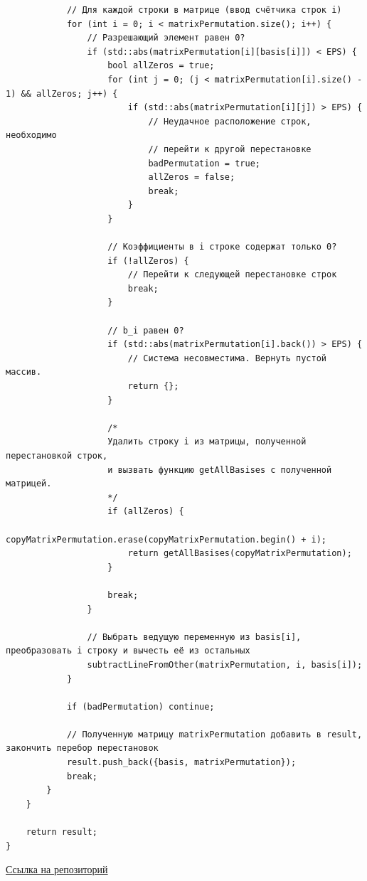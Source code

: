 \documentclass[a4paper,14pt]{extarticle}
\begin{document}
\begin{verbatim}
            // Для каждой строки в матрице (ввод счётчика строк i)
            for (int i = 0; i < matrixPermutation.size(); i++) {
                // Разрешающий элемент равен 0? 
                if (std::abs(matrixPermutation[i][basis[i]]) < EPS) {
                    bool allZeros = true;
                    for (int j = 0; (j < matrixPermutation[i].size() - 1) && allZeros; j++) {
                        if (std::abs(matrixPermutation[i][j]) > EPS) {
                            // Неудачное расположение строк, необходимо
                            // перейти к другой перестановке
                            badPermutation = true;
                            allZeros = false;
                            break;
                        }
                    }

                    // Коэффициенты в i строке содержат только 0?
                    if (!allZeros) {
                        // Перейти к следующей перестановке строк
                        break;
                    }

                    // b_i равен 0?
                    if (std::abs(matrixPermutation[i].back()) > EPS) {
                        // Система несовместима. Вернуть пустой массив.
                        return {};
                    }

                    /*
                    Удалить строку i из матрицы, полученной перестановкой строк,
                    и вызвать функцию getAllBasises с полученной матрицей.
                    */
                    if (allZeros) {
                        copyMatrixPermutation.erase(copyMatrixPermutation.begin() + i);
                        return getAllBasises(copyMatrixPermutation);
                    }

                    break;
                }

                // Выбрать ведущую переменную из basis[i], преобразовать i строку и вычесть её из остальных
                subtractLineFromOther(matrixPermutation, i, basis[i]);
            }

            if (badPermutation) continue;

            // Полученную матрицу matrixPermutation добавить в result, закончить перебор перестановок
            result.push_back({basis, matrixPermutation});
            break;
        }
    }

    return result;
}
    \end{verbatim}
\href{https://github.com/IAmProgrammist/operations_research/blob/master/src/libs/alg/lab1/task1.tpp}{Ссылка на репозиторий}\\
\end{document}
